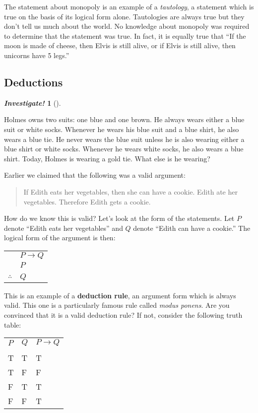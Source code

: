 \documentclass[10pt,]{book}
\newcommand{\terminology}[1]{\textbf{#1}}
\theoremstyle{plain}
\theoremstyle{definition}
\theoremstyle{definition}
\newtheorem{investigation}[project]{\emph{Investigate!}}
\theoremstyle{definition}
\numberwithin{equation}{chapter}
\newcommand{\hrulethin}  {\noalign{\hrule height 0.04em}}
\def\imp{\rightarrow}
\begin{document}
          The statement about monopoly is an example of a \emph{tautology}, a statement which is true on the basis of its logical form alone. Tautologies are always true but they don't tell us much about the world. No knowledge about monopoly was required to determine that the statement was true. In fact, it is equally true that ``If the moon is made of cheese, then Elvis is still alive, or if Elvis is still alive, then unicorns have 5 legs.''
\typeout{************************************************}
\typeout{************************************************}
\subsection[Deductions]{Deductions}\label{subsection-28}
\begin{investigation}[]\label{investigation-25}

            Holmes owns two suits: one blue and one brown. He always wears either a blue suit or white socks. Whenever he wears his blue suit and a blue shirt, he also wears a blue tie. He never wears the blue suit unless he is also wearing either a blue shirt or white socks. Whenever he wears white socks, he also wears a blue shirt. Today, Holmes is wearing a gold tie. What else is he wearing?
\end{investigation}

          Earlier we claimed that the following was a valid argument:
\begin{quote}
          If Edith eats her vegetables, then she can have a cookie. Edith ate her vegetables. Therefore Edith gets a cookie.
        \end{quote}
\par

          How do we know this is valid? Let's look at the form of the statements. Let \(P\) denote ``Edith eats her vegetables'' and \(Q\) denote ``Edith can have a cookie.'' The logical form of the argument is then:
\begin{tabular}{ll}
&\(P \imp Q\)\tabularnewline[0pt]
&\(P\)\tabularnewline[0pt]
&\tabularnewline\hrulethin
\(\therefore\)&\(Q\)
\end{tabular}
\par

          This is an example of a \terminology{deduction rule}, an argument form which is always valid. This one is a particularly famous rule called \emph{modus ponens}\index{}. Are you convinced that it is a valid deduction rule? If not, consider the following truth table:
\begin{tabular}{lll}
\(P\)&\(Q\)&\(P\imp Q\)\tabularnewline[0pt]
&&\tabularnewline\hrulethin
T&T&T\tabularnewline[0pt]
T&F&F\tabularnewline[0pt]
F&T&T\tabularnewline[0pt]
F&F&T
\end{tabular}
\par
\end{document}
